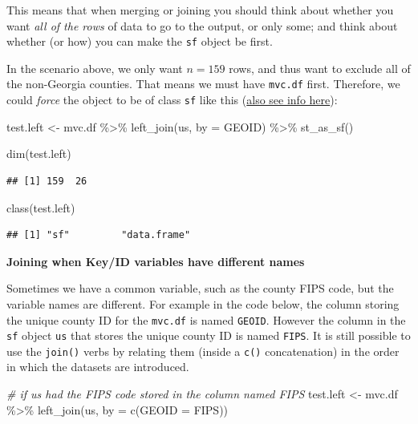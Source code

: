 \documentclass[
]{book}
\newenvironment{Shaded}{\begin{snugshade}}{\end{snugshade}}
\newcommand{\AttributeTok}[1]{\textcolor[rgb]{0.77,0.63,0.00}{#1}}
\newcommand{\CommentTok}[1]{\textcolor[rgb]{0.56,0.35,0.01}{\textit{#1}}}
\newcommand{\FunctionTok}[1]{\textcolor[rgb]{0.00,0.00,0.00}{#1}}
\newcommand{\NormalTok}[1]{#1}
\newcommand{\OtherTok}[1]{\textcolor[rgb]{0.56,0.35,0.01}{#1}}
\newcommand{\SpecialCharTok}[1]{\textcolor[rgb]{0.00,0.00,0.00}{#1}}
\newcommand{\StringTok}[1]{\textcolor[rgb]{0.31,0.60,0.02}{#1}}
\begin{document}
This means that when merging or joining you should think about whether you want \emph{all of the rows} of data to go to the output, or only some; and think about whether (or how) you can make the \texttt{sf} object be first.

In the scenario above, we only want \(n=159\) rows, and thus want to exclude all of the non-Georgia counties. That means we must have \texttt{mvc.df} first. Therefore, we could \emph{force} the object to be of class \texttt{sf} like this (\protect\hyperlink{st-as-sf}{also see info here}):

\begin{Shaded}
\begin{Highlighting}[]
\NormalTok{test.left }\OtherTok{\textless{}{-}}\NormalTok{ mvc.df }\SpecialCharTok{\%\textgreater{}\%}
  \FunctionTok{left\_join}\NormalTok{(us, }\AttributeTok{by =} \StringTok{\textquotesingle{}GEOID\textquotesingle{}}\NormalTok{) }\SpecialCharTok{\%\textgreater{}\%}
  \FunctionTok{st\_as\_sf}\NormalTok{()}

\FunctionTok{dim}\NormalTok{(test.left)}
\end{Highlighting}
\end{Shaded}

\begin{verbatim}
## [1] 159  26
\end{verbatim}

\begin{Shaded}
\begin{Highlighting}[]
\FunctionTok{class}\NormalTok{(test.left)}
\end{Highlighting}
\end{Shaded}

\begin{verbatim}
## [1] "sf"         "data.frame"
\end{verbatim}

\textbf{Joining when Key/ID variables have different names}

Sometimes we have a common variable, such as the county FIPS code, but the variable names are different. For example in the code below, the column storing the unique county ID for the \texttt{mvc.df} is named \texttt{GEOID}. However the column in the \texttt{sf} object \texttt{us} that stores the unique county ID is named \texttt{FIPS}. It is still possible to use the \texttt{join()} verbs by relating them (inside a \texttt{c()} concatenation) in the order in which the datasets are introduced.

\begin{Shaded}
\begin{Highlighting}[]
\CommentTok{\# if us had the FIPS code stored in the column named \textquotesingle{}FIPS\textquotesingle{}}
\NormalTok{test.left }\OtherTok{\textless{}{-}}\NormalTok{ mvc.df }\SpecialCharTok{\%\textgreater{}\%}
  \FunctionTok{left\_join}\NormalTok{(us, }\AttributeTok{by =} \FunctionTok{c}\NormalTok{(}\StringTok{\textquotesingle{}GEOID\textquotesingle{}} \OtherTok{=} \StringTok{\textquotesingle{}FIPS\textquotesingle{}}\NormalTok{))}
\end{Highlighting}
\end{Shaded}
\end{document}
